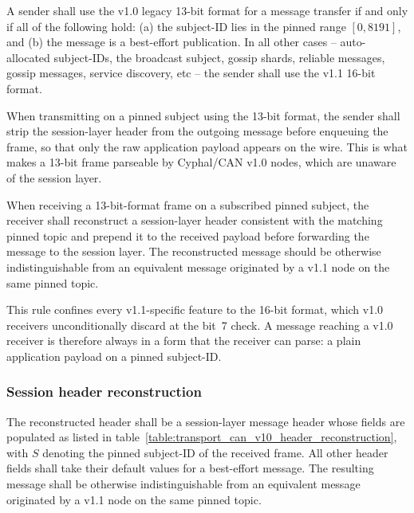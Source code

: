 A sender shall use the v1.0 legacy 13-bit format for a message transfer if and only if all of the following hold:
(a) the subject-ID lies in the pinned range $[0, 8191]$, and
(b) the message is a best-effort publication.
In all other cases -- auto-allocated subject-IDs, the broadcast subject, gossip shards, reliable messages,
gossip messages, service discovery, etc -- the sender shall use the v1.1 16-bit format.

When transmitting on a pinned subject using the 13-bit format, the sender shall strip the session-layer
header from the outgoing message before enqueuing the frame, so that only the raw application payload
appears on the wire. This is what makes a 13-bit frame parseable by Cyphal/CAN v1.0 nodes,
which are unaware of the session layer.

When receiving a 13-bit-format frame on a subscribed pinned subject, the receiver shall reconstruct a
session-layer header consistent with the matching pinned topic and prepend it to the received payload
before forwarding the message to the session layer. The reconstructed message should be otherwise
indistinguishable from an equivalent message originated by a v1.1 node on the same pinned topic.

\begin{remark}
    This rule confines every v1.1-specific feature to the 16-bit format, which v1.0 receivers unconditionally
    discard at the bit~7 check. A message reaching a v1.0 receiver is therefore always in a form that the
    receiver can parse: a plain application payload on a pinned subject-ID.
\end{remark}

\subsubsection{Session header reconstruction}\label{sec:transport_can_v10_header_reconstruction}

The reconstructed header shall be a session-layer message header
whose fields are populated as listed in table~\ref{table:transport_can_v10_header_reconstruction},
with $S$ denoting the pinned subject-ID of the received frame. All other header fields shall take their
default values for a best-effort message. The resulting message shall be otherwise indistinguishable from
an equivalent message originated by a v1.1 node on the same pinned topic.

